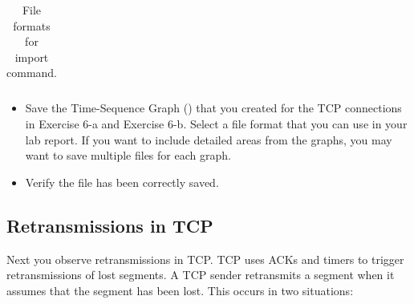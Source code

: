 \begin{enumerate}
\begin{table}[ht]
\begin{tabular}{ | c | c | c |}
				\end{tabular}
			\caption{File formats for import command.}
			\label{tab:lab5-file-formats}
		\end{table}
		\begin{itemize}
			\item Save the Time-Sequence Graph () that you created for the TCP connections in Exercise 6-a and Exercise 6-b. Select a file format that you can use in your lab report. If you want to include detailed areas from the graphs, you may want to save multiple files for each graph.
			\item Verify the file has been correctly saved.
		\end{itemize}
\end{enumerate}

\begin{questions}
\end{questions}
	
\newpage
\subsection{Retransmissions in TCP}
Next you observe retransmissions in TCP. TCP uses ACKs and timers to trigger retransmissions of lost segments. A TCP sender retransmits a segment when it assumes that the segment has been lost. This occurs in two situations:

